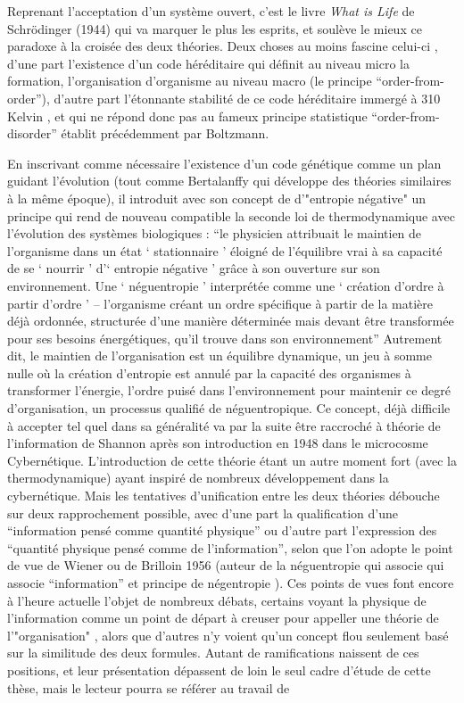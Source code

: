 Reprenant l'acceptation d'un système ouvert, c'est le livre \textit{What is Life} de Schrödinger (1944) qui va marquer le plus les esprits, et soulève le mieux ce paradoxe à la croisée des deux théories. Deux choses au moins fascine celui-ci \autocite{Foerster1959}, d'une part l'existence d'un code héréditaire qui définit au niveau micro la formation, l'organisation d'organisme au niveau macro (le principe \enquote{order-from-order}), d'autre part l'étonnante stabilité de ce code héréditaire immergé à 310 Kelvin \autocite[47]{Schrodinger1944}, et qui ne répond donc pas au fameux principe statistique \enquote{order-from-disorder} établit précédemment par Boltzmann.

En inscrivant comme nécessaire l'existence d'un code génétique comme un plan guidant l'évolution (tout comme Bertalanffy qui développe des théories similaires à la même époque), il introduit avec son concept de d'"entropie négative" un principe qui rend de nouveau compatible la seconde loi de thermodynamique avec l'évolution des systèmes biologiques : \enquote{le physicien attribuait le maintien de l’organisme dans un état \enquote{ stationnaire } éloigné de l’équilibre vrai à sa capacité de se \enquote{ nourrir } d’\enquote{ entropie négative } grâce à son ouverture sur son environnement. Une \enquote{ néguentropie } interprétée comme une \enquote{ création d’ordre à partir d’ordre } -- l’organisme créant un ordre spécifique à partir de la matière déjà ordonnée, structurée d’une manière déterminée mais devant être transformée pour ses besoins énergétiques, qu’il trouve dans son environnement} \autocite[502]{Pouvreau2013} Autrement dit, le maintien de l'organisation est un équilibre dynamique, un jeu à somme nulle où la création d'entropie est annulé par la capacité des organismes à transformer l'énergie, l'ordre puisé dans l'environnement pour maintenir ce degré d'organisation, un processus qualifié de néguentropique. Ce concept, déjà difficile à accepter tel quel dans sa généralité \autocite[225]{Lemoigne1977} va par la suite être raccroché à théorie de l'information de Shannon après son introduction en 1948 dans le microcosme Cybernétique. L'introduction de cette théorie étant un autre moment fort (avec la thermodynamique) ayant inspiré de nombreux développement dans la cybernétique. Mais les tentatives d'unification entre les deux théories débouche sur deux rapprochement possible, avec d'une part la qualification d'une \enquote{information pensé comme quantité physique} ou d'autre part l'expression des \enquote{quantité physique pensé comme de l'information}, selon que l'on adopte le point de vue de Wiener ou de Brilloin 1956 (auteur de la néguentropie qui associe qui associe \enquote{information} et principe de négentropie ). Ces points de vues font encore à l'heure actuelle l'objet de nombreux débats, certains voyant la physique de l'information comme un point de départ à creuser pour appeller une théorie de l'"organisation" \autocite[37-38]{Morin2005}, alors que d'autres n'y voient qu'un concept flou seulement basé sur la similitude des deux formules.  Autant de ramifications naissent de ces positions, et leur présentation dépassent de loin le seul cadre d'étude de cette thèse, mais le lecteur pourra se référer au travail de 